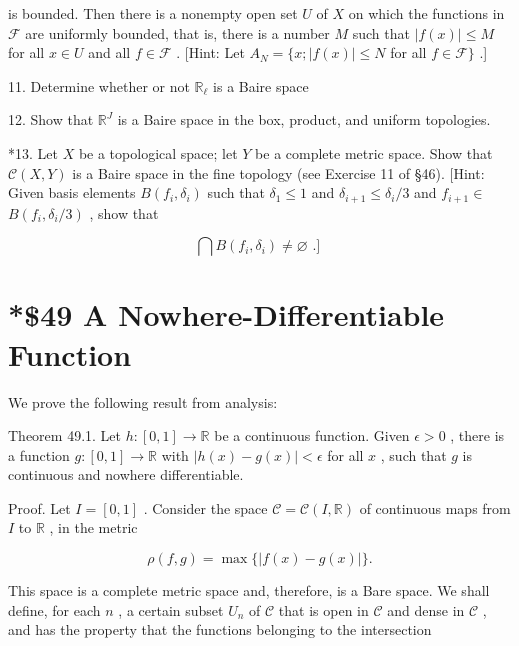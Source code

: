 is bounded. Then there is a nonempty open set \(U\) of \(X\) on which the functions in \(\mathcal{F}\) are uniformly bounded, that is, there is a number \(M\) such that \(\left| {f\left( x\right) }\right|  \leq  M\) for all \(x \in  U\) and all \(f \in  \mathcal{F}\) . [Hint: Let \({A}_{N} = \{ x;\left| {f\left( x\right) }\right|  \leq  N\) for all \(f \in  \mathcal{F}\}\) .]

11. Determine whether or not \({\mathbb{R}}_{\ell }\) is a Baire space

12. Show that \({\mathbb{R}}^{J}\) is a Baire space in the box, product, and uniform topologies.

*13. Let \(X\) be a topological space; let \(Y\) be a complete metric space. Show that \(\mathcal{C}\left( {X,Y}\right)\) is a Baire space in the fine topology (see Exercise 11 of §46). [Hint: Given basis elements \(B\left( {{f}_{i},{\delta }_{i}}\right)\) such that \({\delta }_{1} \leq  1\) and \({\delta }_{i + 1} \leq  {\delta }_{i}/3\) and \({f}_{i + 1} \in\)  \(B\left( {{f}_{i},{\delta }_{i}/3}\right)\) , show that

\[
\bigcap B\left( {{f}_{i},{\delta }_{i}}\right)  \neq  \varnothing \text{ .] }
\]

\section*{*\$49 A Nowhere-Differentiable Function}

We prove the following result from analysis:

Theorem 49.1. Let \(h : \left\lbrack  {0,1}\right\rbrack   \rightarrow  \mathbb{R}\) be a continuous function. Given \(\epsilon  > 0\) , there is a function \(g : \left\lbrack  {0,1}\right\rbrack   \rightarrow  \mathbb{R}\) with \(\left| {h\left( x\right)  - g\left( x\right) }\right|  < \epsilon\) for all \(x\) , such that \(g\) is continuous and nowhere differentiable.

Proof. Let \(I = \left\lbrack  {0,1}\right\rbrack\) . Consider the space \(\mathcal{C} = \mathcal{C}\left( {I,\mathbb{R}}\right)\) of continuous maps from \(I\) to \(\mathbb{R}\) , in the metric

\[
\rho \left( {f,g}\right)  = \max \{ \left| {f\left( x\right)  - g\left( x\right) }\right| \} .
\]

This space is a complete metric space and, therefore, is a Bare space. We shall define, for each \(n\) , a certain subset \({U}_{n}\) of \(\mathcal{C}\) that is open in \(\mathcal{C}\) and dense in \(\mathcal{C}\) , and has the property that the functions belonging to the intersection

